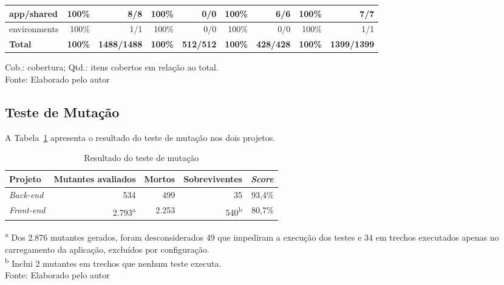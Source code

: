 \begin{table}[H]
{\begin{tabular}{|l|r|r|r|r|r|r|r|r|}
    \hline
    app/shared                       & 100\% & 8/8 & 100\% & 0/0 & 100\% & 6/6 & 100\% & 7/7 \\
    \hline
    environments                     & 100\% & 1/1 & 100\% & 0/0 & 100\% & 0/0 & 100\% & 1/1 \\
    \hline
    \textbf{Total} & \textbf{100\%} & \textbf{1488/1488} & \textbf{100\%} & \textbf{512/512} & \textbf{100\%} & \textbf{428/428} & \textbf{100\%} & \textbf{1399/1399} \\
    \hline
    \end{tabular}%
}
\begin{center}
    {\small Cob.: cobertura; Qtd.: itens cobertos em relação ao total.}\\
    {\small Fonte: Elaborado pelo autor}
\end{center}
\end{table}

\subsection{Teste de Mutação}

A Tabela~\ref{tab:mutacao} apresenta o resultado do teste de mutação nos dois projetos.

\begin{table}[H]
\centering
\renewcommand{\arraystretch}{1.4}
\caption{Resultado do teste de mutação}
\label{tab:mutacao}
    \begin{tabular}{|l|r|r|r|r|}
    \hline
    \textbf{Projeto} & \textbf{Mutantes avaliados} & \textbf{Mortos} & \textbf{Sobreviventes} & \textbf{\textit{Score}} \\
    \hline
    \textit{Back-end} & 534 & 499 & 35 & 93,4\% \\
    \hline
    \textit{Front-end} & 2.793\textsuperscript{a} & 2.253 & 540\textsuperscript{b} & 80,7\% \\
    \hline
    \end{tabular}
\begin{center}
    {\small \textsuperscript{a} Dos 2.876 mutantes gerados, foram desconsiderados 49 que impediram a execução dos testes e 34 em trechos executados apenas no carregamento da aplicação, excluídos por configuração.}\\
    {\small \textsuperscript{b} Inclui 2 mutantes em trechos que nenhum teste executa.}\\
    {\small Fonte: Elaborado pelo autor}
\end{center}
\end{table}

